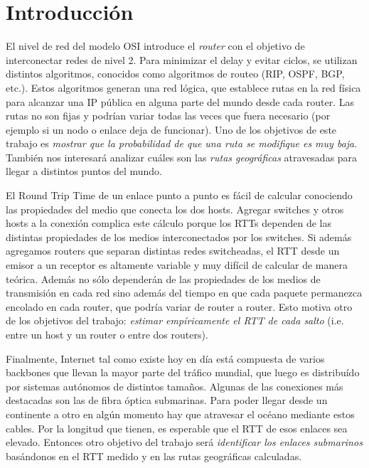 \section{Introducción} \label{intro}

El nivel de red del modelo OSI introduce el \emph{router} con el objetivo de interconectar redes de nivel 2. 
Para minimizar el delay y evitar ciclos, se utilizan distintos algoritmos, conocidos como algoritmos de routeo (RIP, OSPF, BGP, etc.).
Estos algoritmos generan una red lógica, que establece rutas en la red física para alcanzar una IP pública en alguna parte del mundo desde cada router.
Las rutas no son fijas y podrían variar todas las veces que fuera necesario (por ejemplo si un nodo o enlace deja de funcionar). Uno de los
objetivos de este trabajo es \emph{mostrar que la probabilidad de que una ruta se modifique es muy baja}. También nos interesará analizar cuáles son las
\emph{rutas geográficas} atravesadas para llegar a distintos puntos del mundo.

El Round Trip Time de un enlace punto a punto es fácil de calcular conociendo las propiedades del medio que conecta los dos hosts. Agregar
switches y otros hosts a la conexión complica este cálculo porque los RTTs dependen de las distintas propiedades de los medios interconectados por los
switches. Si además agregamos routers que separan distintas redes switcheadas, el RTT desde un emisor a un receptor es altamente variable
y muy difícil de calcular de manera teórica. Además no sólo dependerán de las propiedades de los medios de transmisión en cada red sino además del
tiempo en que cada paquete permanezca encolado en cada router, que podría variar de router a router. Esto motiva otro de los objetivos del trabajo:
\emph{estimar empíricamente el RTT de cada salto} (i.e. entre un host y un router o entre dos routers).

Finalmente, Internet tal como existe hoy en día está compuesta de varios backbones que llevan la mayor parte del tráfico mundial, que luego
es distribuído por sistemas autónomos de distintos tamaños. Algunas de las conexiones más destacadas son las de fibra óptica submarinas.
Para poder llegar desde un continente a otro en algún momento hay que atravesar el océano mediante estos cables. Por la longitud que tienen,
es esperable que el RTT de esos enlaces sea elevado. Entonces otro objetivo del trabajo será \emph{identificar los enlaces submarinos} basándonos en el RTT
medido y en las rutas geográficas calculadas.